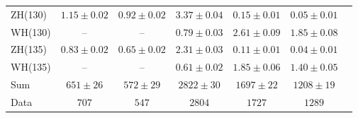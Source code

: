 \documentclass[11pt,twoside,a4paper,cmspaper,final,collab]{cms-tdr}
\begin{document}
\begin{table}[tbp]
\begin{center}
{\begin{tabular}{lcccccc}
ZH(130) & $1.15 \pm 0.02$ & $0.92 \pm 0.02$ & $3.37\pm 0.04$ &  $0.15 \pm 0.01$ &  $0.05 \pm 0.01$ \\
WH(130) & -- & -- & $0.79\pm 0.03$ & $2.61 \pm 0.09$ & $1.85 \pm 0.08$ \\
ZH(135) & $0.83 \pm 0.02$ &   $0.65 \pm 0.02$ & $2.31\pm 0.03$ &  $0.11 \pm 0.01$ &  $0.04 \pm 0.01$ \\
WH(135) & -- & -- & $0.61\pm 0.02$ & $1.85 \pm 0.06$ & $1.40 \pm 0.05$ \\
\hline
Sum &$651 \pm 26$& $572 \pm 29$ & $2822 \pm 30$ & $1697 \pm 22$ & $1208 \pm 19$ \\\hline
Data &  $707$ &  $547$ & $2804$ & $1727$ &$1289$  \\ \hline
\end{tabular}
}
\end{center}
\end{table}
\end{document}
